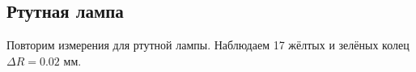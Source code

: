 \documentclass[a4paper,12pt]{article}
\theoremstyle{definition}
\begin{document}
\subsection{Ртутная лампа}
Повторим измерения для ртутной лампы. Наблюдаем 17 жёлтых и зелёных колец $\Delta {R} = 0.02$ мм.
\begin{figure}[H]
	\begin{minipage}[h]{0.5\linewidth}
	\end{minipage}
	\begin{minipage}[h]{0.5\linewidth}
	\end{minipage}
\end{figure}
\end{document}
